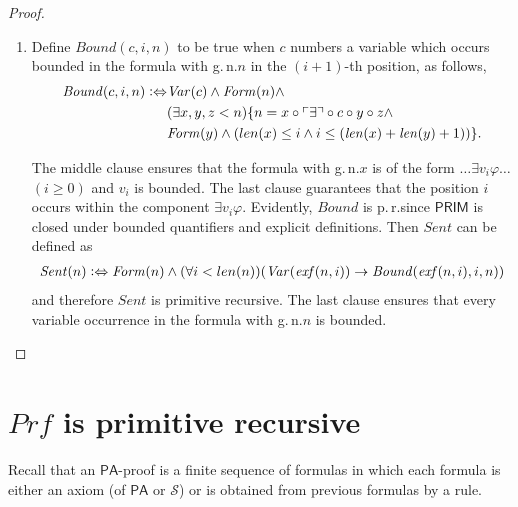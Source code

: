 \begin{proof}
\begin{enumerate}
 
\item Define $\mathit{Bound}(c,i,n)$ to be true when $c$ numbers a variable which occurs bounded in the formula with g.\,n.\@ $n$ in the $(i+1)$-th position, as follows,
\begin{align*}
\mathit{Bound}(c,i,n) \vcentcolon \Leftrightarrow & \mathit{Var}(c) \wedge \mathit{Form}(n)  \wedge \\ &(\exists x, y, z < n )  \lbrace  n = x \circ \ulcorner \exists \urcorner \circ c \circ y \circ z   \wedge \\
& \mathit{Form}(y) \wedge (len(x) \le i \wedge i \le (\mathit{len}(x) + \mathit{len}(y) + 1)) \rbrace.
\end{align*}

The middle clause ensures that the formula with g.\,n.\@ $x$ is of the form $\ldots \exists v_i \varphi \ldots$ $(i \ge 0)$ and $v_i$ is bounded. The last clause guarantees that the position $i$ occurs within the component $\exists v_i \varphi$. Evidently, $\mathit{Bound}$ is p.\,r.\@ since $\mathsf{PRIM}$ is closed under bounded quantifiers and explicit definitions. Then $\mathit{Sent}$ can be defined as 
\begin{align*}
\mathit{Sent}(n) \vcentcolon \Leftrightarrow \mathit{Form}(n) \wedge ( \forall i < len(n))  (\mathit{Var}(\mathit{exf}(n,i)) \rightarrow \mathit{Bound}(\mathit{exf}(n,i), i, n))
\end{align*} 
and therefore $\mathit{Sent}$ is primitive recursive. The last clause ensures that every variable occurrence in the formula with g.\,n.\@ $n$ is bounded. 
\end{enumerate}
\end{proof} 
 
\section{$\mathit{Prf}$ is primitive recursive}
Recall that an $\mathsf{PA}$-proof is a finite sequence of formulas in which each formula is either an axiom (of $\mathsf{PA}$ or $\mathcal{S}$) or is obtained from previous formulas by a rule. 

